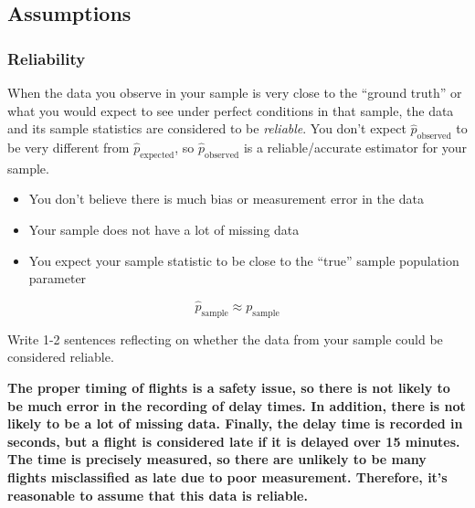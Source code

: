 \documentclass[
  letterpaper,
  DIV=11,
  numbers=noendperiod]{scrartcl}
\begin{document}
\subsection{Assumptions}\label{assumptions}

\subsubsection{Reliability}\label{reliability}

When the data you observe in your sample is very close to the ``ground
truth'' or what you would expect to see under perfect conditions in that
sample, the data and its sample statistics are considered to be
\emph{reliable}. You don't expect \(\hat{p}_{\text{observed}}\) to be
very different from \(\hat{p}_{\text{expected}}\), so
\(\hat{p}_{\text{observed}}\) is a reliable/accurate estimator for your
sample.

\begin{itemize}
\item
  You don't believe there is much bias or measurement error in the data
\item
  Your sample does not have a lot of missing data
\item
  You expect your sample statistic to be close to the ``true'' sample
  population parameter
\end{itemize}

\[\hat{p}_{\text{sample}} \approx p_{\text{sample}}\]

Write 1-2 sentences reflecting on whether the data from your sample
could be considered reliable.

\begin{tcolorbox}[enhanced jigsaw, toprule=.15mm, breakable, leftrule=.75mm, bottomrule=.15mm, rightrule=.15mm, colback=white, opacityback=0, colframe=quarto-callout-warning-color-frame, left=2mm, arc=.35mm]

\textbf{The proper timing of flights is a safety issue, so there is not
likely to be much error in the recording of delay times. In addition,
there is not likely to be a lot of missing data. Finally, the delay time
is recorded in seconds, but a flight is considered late if it is delayed
over 15 minutes. The time is precisely measured, so there are unlikely
to be many flights misclassified as late due to poor measurement.
Therefore, it's reasonable to assume that this data is reliable.}

\end{tcolorbox}
\end{document}
